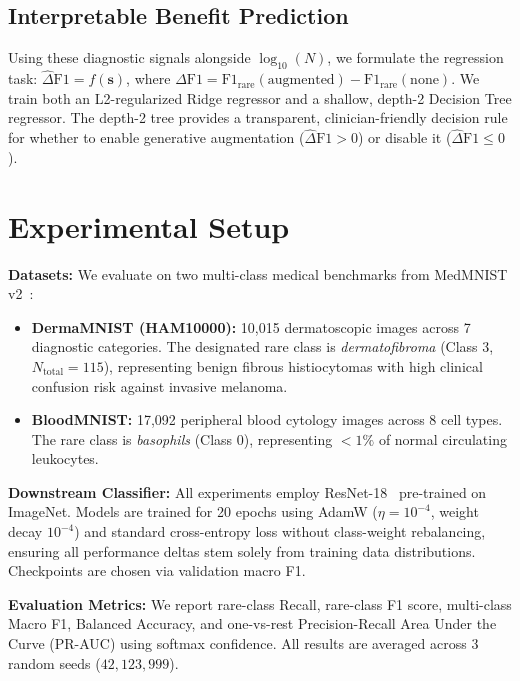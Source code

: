 \documentclass[runningheads]{llncs}
\begin{document}
\subsection{Interpretable Benefit Prediction}
Using these diagnostic signals alongside $\log_{10}(N)$, we formulate the regression task: $\hat{\Delta}\text{F1} = f(\mathbf{s})$, where $\Delta\text{F1} = \text{F1}_{\text{rare}}(\text{augmented}) - \text{F1}_{\text{rare}}(\text{none})$. We train both an L2-regularized Ridge regressor and a shallow, depth-2 Decision Tree regressor. The depth-2 tree provides a transparent, clinician-friendly decision rule for whether to enable generative augmentation ($\hat{\Delta}\text{F1} > 0$) or disable it ($\hat{\Delta}\text{F1} \le 0$).

\section{Experimental Setup}
\label{sec:experiments}
\noindent \textbf{Datasets:} We evaluate on two multi-class medical benchmarks from MedMNIST v2~\cite{yang2023medmnist}:
\begin{itemize}
    \item \textbf{DermaMNIST (HAM10000):} 10,015 dermatoscopic images across 7 diagnostic categories. The designated rare class is \textit{dermatofibroma} (Class 3, $N_{\text{total}} = 115$), representing benign fibrous histiocytomas with high clinical confusion risk against invasive melanoma.
    \item \textbf{BloodMNIST:} 17,092 peripheral blood cytology images across 8 cell types. The rare class is \textit{basophils} (Class 0), representing $<1\%$ of normal circulating leukocytes.
\end{itemize}

\noindent \textbf{Downstream Classifier:} All experiments employ ResNet-18~\cite{he2016deep} pre-trained on ImageNet. Models are trained for 20 epochs using AdamW ($\eta = 10^{-4}$, weight decay $10^{-4}$) and standard cross-entropy loss without class-weight rebalancing, ensuring all performance deltas stem solely from training data distributions. Checkpoints are chosen via validation macro F1.

\noindent \textbf{Evaluation Metrics:} We report rare-class Recall, rare-class F1 score, multi-class Macro F1, Balanced Accuracy, and one-vs-rest Precision-Recall Area Under the Curve (PR-AUC) using softmax confidence. All results are averaged across 3 random seeds ($42, 123, 999$).
\end{document}
